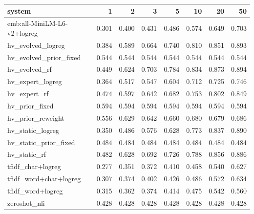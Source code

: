 \begin{tabular}{lrrrrrrr}
\toprule
system & 1 & 2 & 3 & 5 & 10 & 20 & 50 \\
\midrule
emb:all-MiniLM-L6-v2+logreg & 0.301 & 0.400 & 0.431 & 0.486 & 0.574 & 0.649 & 0.703 \\
hv\_evolved\_logreg & 0.384 & 0.589 & 0.664 & 0.740 & 0.810 & 0.851 & 0.893 \\
hv\_evolved\_prior\_fixed & 0.544 & 0.544 & 0.544 & 0.544 & 0.544 & 0.544 & 0.544 \\
hv\_evolved\_rf & 0.449 & 0.624 & 0.703 & 0.784 & 0.834 & 0.873 & 0.894 \\
hv\_expert\_logreg & 0.364 & 0.517 & 0.547 & 0.604 & 0.712 & 0.725 & 0.746 \\
hv\_expert\_rf & 0.474 & 0.597 & 0.642 & 0.682 & 0.753 & 0.802 & 0.849 \\
hv\_prior\_fixed & 0.594 & 0.594 & 0.594 & 0.594 & 0.594 & 0.594 & 0.594 \\
hv\_prior\_reweight & 0.556 & 0.629 & 0.642 & 0.660 & 0.680 & 0.679 & 0.686 \\
hv\_static\_logreg & 0.350 & 0.486 & 0.576 & 0.628 & 0.773 & 0.837 & 0.890 \\
hv\_static\_prior\_fixed & 0.484 & 0.484 & 0.484 & 0.484 & 0.484 & 0.484 & 0.484 \\
hv\_static\_rf & 0.482 & 0.628 & 0.692 & 0.726 & 0.788 & 0.856 & 0.886 \\
tfidf\_char+logreg & 0.277 & 0.351 & 0.372 & 0.410 & 0.458 & 0.540 & 0.627 \\
tfidf\_word+char+logreg & 0.307 & 0.374 & 0.402 & 0.426 & 0.486 & 0.572 & 0.634 \\
tfidf\_word+logreg & 0.315 & 0.362 & 0.374 & 0.414 & 0.475 & 0.542 & 0.560 \\
zeroshot\_nli & 0.428 & 0.428 & 0.428 & 0.428 & 0.428 & 0.428 & 0.428 \\
\bottomrule
\end{tabular}
